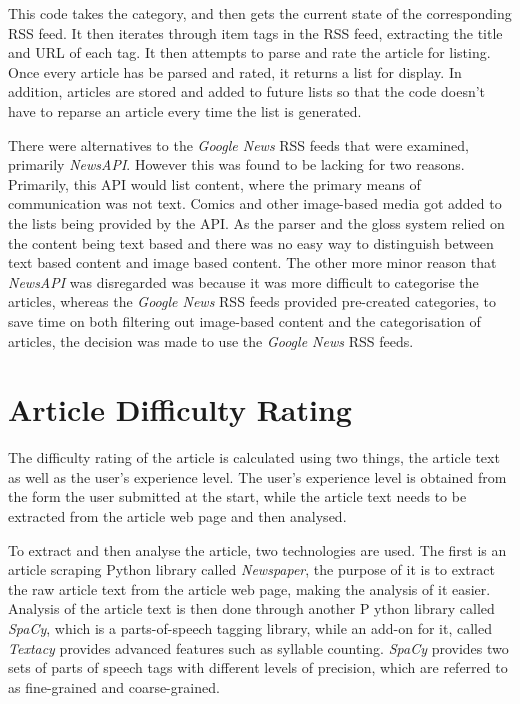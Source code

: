 

This code takes the category, and then gets the current state of the corresponding RSS feed. It then iterates through item tags in the RSS feed, extracting the title and URL of each tag. It then attempts to parse and rate the article for listing. Once every article has be parsed and rated, it returns a list for display. In addition, articles are stored and added to future lists so that the code doesn't have to reparse an article every time the list is generated.

There were alternatives to the \textit{Google News} RSS feeds that were examined, primarily \textit{NewsAPI}. However this was found to be lacking for two reasons. Primarily, this API would list content, where the primary means of communication was not text. Comics and other image-based media got added to the lists being provided by the API. As the parser and the gloss system relied on the content being text based and there was no easy way to distinguish between text based content and image based content. The other more minor reason that \textit{NewsAPI} was disregarded was because it was more difficult to categorise the articles, whereas the \textit{Google News} RSS feeds provided pre-created categories, to save time on both filtering out image-based content and the categorisation of articles, the decision was made to use the \textit{Google News} RSS feeds. 


\section{Article Difficulty Rating}

The difficulty rating of the article is calculated using two things, the article text as well as the user's experience level. The user's experience level is obtained from the form the user submitted at the start, while the article text needs to be extracted from the article web page and then analysed.

To extract and then analyse the article, two technologies are used. The first is an article scraping Python library called \textit{Newspaper}, the purpose of it is to extract the raw article text from the article web page, making the analysis of it easier. Analysis of the article text is then done through another P ython library called \textit{SpaCy}, which is a parts-of-speech tagging library, while an add-on for it, called \textit{Textacy} provides advanced features such as syllable counting. \textit{SpaCy} provides two  sets of parts of speech tags with different levels of precision, which are referred to as fine-grained and coarse-grained.

